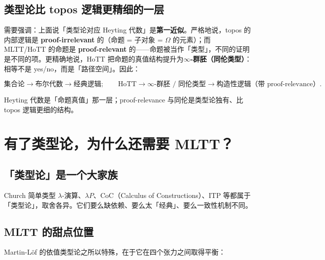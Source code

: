 \documentclass[10pt, openany]{book}
\begin{document}
\subsection{类型论比 topos 逻辑更精细的一层}

需要强调：上面说「类型论对应 Heyting 代数」是\textbf{第一近似}。严格地说，topos 的内部逻辑是 \textbf{proof-irrelevant} 的（命题 = 子对象 = $\Omega$ 的元素）；而 MLTT/HoTT 的命题是 \textbf{proof-relevant} 的——命题被当作「类型」，不同的证明是不同的项。更精确地说，HoTT 把命题的真值结构提升为\textbf{$\infty$-群胚（同伦类型）}：相等不是 yes/no，而是「路径空间」。因此：

\[
  \text{集合论} \to \text{布尔代数} \to \text{经典逻辑};
  \qquad
  \text{HoTT} \to \infty\text{-群胚 / 同伦类型} \to \text{构造性逻辑（带 proof-relevance）}.
\]

Heyting 代数是「命题真值」那一层；proof-relevance 与同伦是类型论独有、比 topos 逻辑更细的结构。

\section{有了类型论，为什么还需要 MLTT？}

\subsection{「类型论」是一个大家族}

Church 简单类型 $\lambda$-演算、$\lambda P$、CoC（Calculus of Constructions）、ITP 等都属于「类型论」，取舍各异。它们要么缺依赖、要么太「经典」、要么一致性机制不同。

\subsection{MLTT 的甜点位置}

Martin-L\"of 的依值类型论之所以特殊，在于它在四个张力之间取得平衡：
\end{document}

